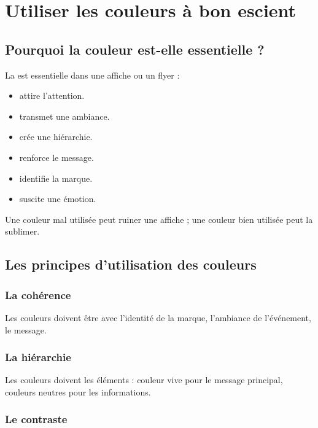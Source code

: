 \section{Utiliser les couleurs à bon escient}

\subsection{Pourquoi la couleur est-elle essentielle ?}

La  est essentielle dans une affiche ou un flyer :

\begin{itemize}
    \item {} attire l'attention.
    \item {} transmet une ambiance.
    \item {} crée une hiérarchie.
    \item {} renforce le message.
    \item {} identifie la marque.
    \item {} suscite une émotion.
\end{itemize}

Une couleur mal utilisée peut ruiner une affiche ; une couleur bien utilisée peut la sublimer.

\subsection{Les principes d'utilisation des couleurs}

\subsubsection{La cohérence}

Les couleurs doivent être  avec l'identité de la marque, l'ambiance de l'événement, le message.

\subsubsection{La hiérarchie}

Les couleurs doivent  les éléments : couleur vive pour le message principal, couleurs neutres pour les informations.

\subsubsection{Le contraste}

